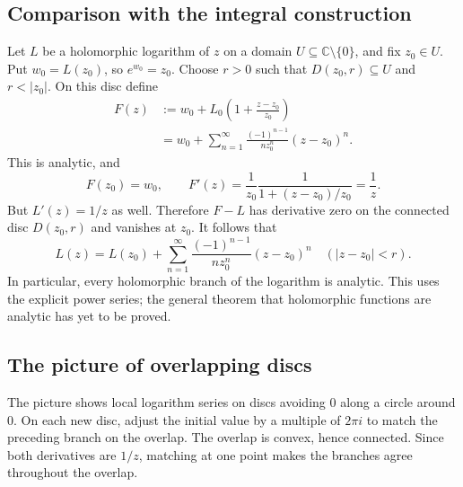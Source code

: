 \documentclass[11pt]{article}
\theoremstyle{plain}
\theoremstyle{definition}
\theoremstyle{remark}
\numberwithin{equation}{section}
\newcommand{\C}{\mathbb{C}}
\newenvironment{lecturefigure}
 {\par\addvspace{0.25em}\begingroup\setlength{\parskip}{0pt}\centering}
 {\par\endgroup\addvspace{0.25em}}
\begin{document}
\subsection{Comparison with the integral construction}
Let $L$ be a holomorphic logarithm of $z$ on a domain
$U\subseteq\C\setminus\{0\}$, and fix $z_0\in U$. Put $w_0=L(z_0)$,
so $e^{w_0}=z_0$. Choose $r>0$ such that
$D(z_0,r)\subseteq U$ and $r<|z_0|$. On this disc define
\begin{align*}
 F(z)&:=w_0+L_0\!\left(1+\frac{z-z_0}{z_0}\right)\\
 &=w_0+\sum_{n=1}^{\infty}\frac{(-1)^{n-1}}{n z_0^n}(z-z_0)^n.
\end{align*}
This is analytic, and
\[
 F(z_0)=w_0,\qquad
 F'(z)=\frac{1}{z_0}\frac{1}{1+(z-z_0)/z_0}=\frac1z.
\]
But $L'(z)=1/z$ as well. Therefore $F-L$ has derivative zero on the
connected disc $D(z_0,r)$ and vanishes at $z_0$. It follows that
\[
 \boxed{\displaystyle
 L(z)=L(z_0)+\sum_{n=1}^{\infty}\frac{(-1)^{n-1}}{n z_0^n}(z-z_0)^n
 \quad (|z-z_0|<r).}
\]
In particular, every holomorphic branch of the logarithm is analytic.
This uses the explicit power series; the general theorem that
holomorphic functions are analytic has yet to be proved.

\begin{lecturefigure}
\end{lecturefigure}

\subsection{The picture of overlapping discs}
The picture shows local logarithm series on discs avoiding $0$ along a
circle around $0$. On each new disc, adjust the initial value by a
multiple of $2\pi i$ to match the preceding branch on the overlap.
The overlap is convex, hence connected. Since both derivatives are $1/z$,
matching at one point makes the branches agree throughout the overlap.
\end{document}
